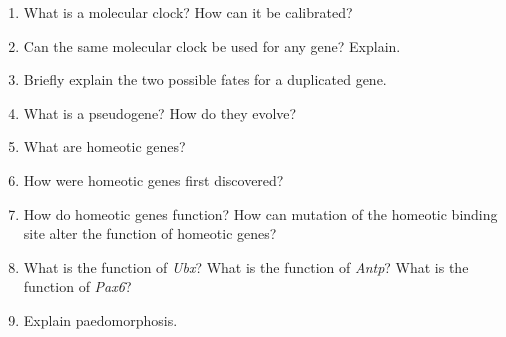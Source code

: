 \documentclass[letterpaper]{tufte-handout}
\begin{document}
\begin{enumerate}

	\item What is a molecular clock? How can it be calibrated?

	\item Can the same molecular clock be used for any gene? Explain. 

	\item Briefly explain the two possible fates for a duplicated gene.

	\item What is a pseudogene? How do they evolve?

	\item What are homeotic genes? 	
	
	\item How were homeotic genes first discovered?
	
	\item How do homeotic genes function? How can mutation of the homeotic binding site alter the function of homeotic genes? 
	
	\item What is the function of \textit{Ubx}? What is the function of \textit{Antp}? What is the function of \textit{Pax6}?
	
	\item Explain paedomorphosis.


\end{enumerate}
\end{document}
